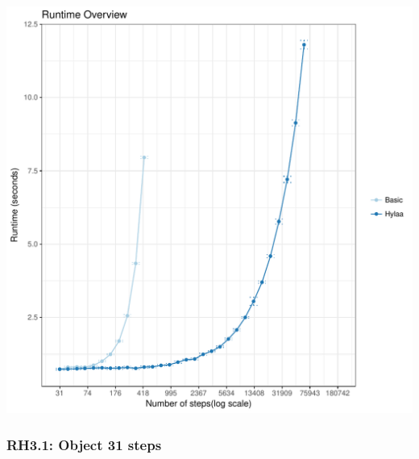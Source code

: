 \documentclass{article}\usepackage[]{graphicx}\usepackage[]{color}
\makeatletter
\def\maxwidth{ %
  \ifdim\Gin@nat@width>\linewidth
    \linewidth
  \else
    \Gin@nat@width
  \fi
}
\newenvironment{knitrout}{}{} %
\makeatother
\begin{document}
 
\begin{knitrout}
\color{fgcolor}
\includegraphics[width=\maxwidth]{figure/overview_RH3-1} 

\end{knitrout}
 	

\subsubsection{RH3.1: Object 31 steps}
\end{document}
